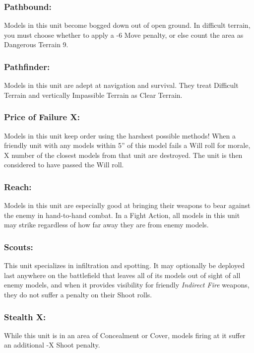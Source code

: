 \begin{multicols}{2}
\subsubsection*{Pathbound:} Models in this unit become bogged down out of open ground. In difficult terrain, you must choose whether to apply a -6 Move penalty, or else count the area as Dangerous Terrain 9.

\subsubsection*{Pathfinder:} Models in this unit are adept at navigation and survival. They treat Difficult Terrain and vertically Impassible Terrain as Clear Terrain.

\subsubsection*{Price of Failure X:} Models in this unit keep order using the harshest possible methods! When a friendly unit with any models within 5'' of this model fails a Will roll for morale, X number of the closest models from that unit are destroyed. The unit is then considered to have passed the Will roll.

\subsubsection*{Reach:} Models in this unit are especially good at bringing their weapons to bear against the enemy in hand-to-hand combat. In a Fight Action, all models in this unit may strike regardless of how far away they are from enemy models.

\subsubsection*{Scouts:} This unit specializes in infiltration and spotting. It may optionally be deployed last anywhere on the battlefield that leaves all of its models out of sight of all enemy models, and when it provides visibility for friendly \textit{Indirect Fire} weapons, they do not suffer a penalty on their Shoot rolls.

\subsubsection*{Stealth X:} While this unit is in an area of Concealment or Cover, models firing at it suffer an additional -X Shoot penalty.


\end{multicols}
